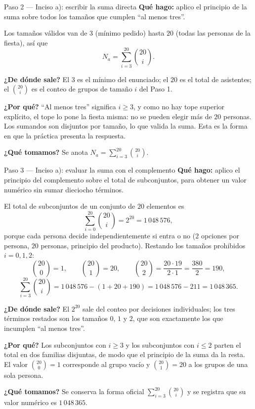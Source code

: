 \documentclass[11pt]{article}
\begin{document}
\begin{paso}{Paso 2 --- Inciso a): escribir la suma directa}
\textbf{Qué hago:} aplico el principio de la suma sobre todos los tamaños que cumplen ``al menos tres''.

Los tamaños válidos van de $3$ (mínimo pedido) hasta $20$ (todas las personas de la fiesta), así que
\[
  N_a=\sum_{i=3}^{20}\binom{20}{i}.
\]

\textbf{¿De dónde sale?} El $3$ es el mínimo del enunciado; el $20$ es el total de asistentes; el $\binom{20}{i}$ es el conteo de grupos de tamaño $i$ del Paso 1.

\textbf{¿Por qué?} ``Al menos tres'' significa $i\ge 3$, y como no hay tope superior explícito, el tope lo pone la fiesta misma: no se pueden elegir más de $20$ personas. Los sumandos son disjuntos por tamaño, lo que valida la suma. Esta es la forma en que la práctica presenta la respuesta.

\textbf{¿Qué tomamos?} Se anota $N_a=\sum_{i=3}^{20}\binom{20}{i}$.
\end{paso}

\begin{paso}{Paso 3 --- Inciso a): evaluar la suma con el complemento}
\textbf{Qué hago:} aplico el principio del complemento sobre el total de subconjuntos, para obtener un valor numérico sin sumar dieciocho términos.

El total de subconjuntos de un conjunto de $20$ elementos es
\[
  \sum_{i=0}^{20}\binom{20}{i}=2^{20}=1\,048\,576 ,
\]
porque cada persona decide independientemente si entra o no ($2$ opciones por persona, $20$ personas, principio del producto). Restando los tamaños prohibidos $i=0,1,2$:
\[
  \binom{20}{0}=1,\qquad \binom{20}{1}=20,\qquad \binom{20}{2}=\frac{20\cdot 19}{2\cdot 1}=\frac{380}{2}=190,
\]
\[
  \sum_{i=3}^{20}\binom{20}{i} = 1\,048\,576 - (1+20+190) = 1\,048\,576 - 211 = 1\,048\,365 .
\]

\textbf{¿De dónde sale?} El $2^{20}$ sale del conteo por decisiones individuales; los tres términos restados son los tamaños $0$, $1$ y $2$, que son exactamente los que incumplen ``al menos tres''.

\textbf{¿Por qué?} Los subconjuntos con $i\ge 3$ y los subconjuntos con $i\le 2$ parten el total en dos familias disjuntas, de modo que el principio de la suma da la resta. El valor $\binom{20}{0}=1$ corresponde al grupo vacío y $\binom{20}{1}=20$ a los grupos de una sola persona.

\textbf{¿Qué tomamos?} Se conserva la forma oficial $\sum_{i=3}^{20}\binom{20}{i}$ y se registra que su valor numérico es $1\,048\,365$.
\end{paso}
\end{document}
